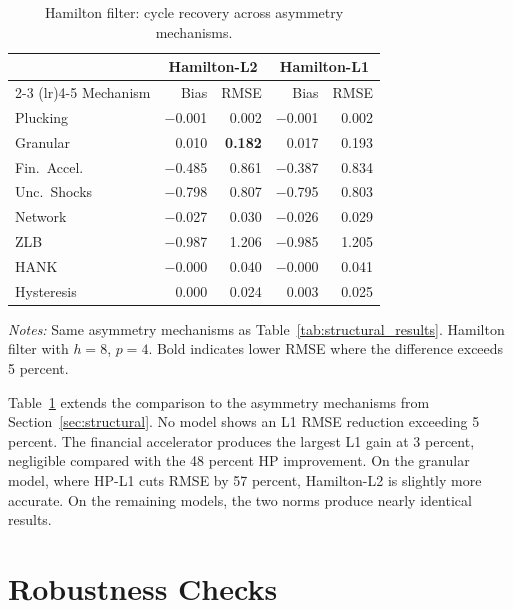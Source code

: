 \documentclass[10pt]{article}
\begin{document}
\begin{table}[htbp]
\centering
\caption{Hamilton filter: cycle recovery across asymmetry mechanisms.}
\label{tab:structural_hamilton}
\begin{tabular}{l rr rr}
\toprule
& \multicolumn{2}{c}{Hamilton-L2} & \multicolumn{2}{c}{Hamilton-L1} \\
\cmidrule(lr){2-3} \cmidrule(lr){4-5}
Mechanism & Bias & RMSE & Bias & RMSE \\
\midrule
Plucking       & $-$0.001 & 0.002 & $-$0.001 & 0.002 \\
Granular       &    0.010 & \textbf{0.182} &    0.017 & 0.193 \\
Fin.\ Accel.   & $-$0.485 & 0.861 & $-$0.387 & 0.834 \\
Unc.\ Shocks   & $-$0.798 & 0.807 & $-$0.795 & 0.803 \\
Network        & $-$0.027 & 0.030 & $-$0.026 & 0.029 \\
ZLB            & $-$0.987 & 1.206 & $-$0.985 & 1.205 \\
HANK           & $-$0.000 & 0.040 & $-$0.000 & 0.041 \\
Hysteresis     &    0.000 & 0.024 &    0.003 & 0.025 \\
\bottomrule
\end{tabular}
\begin{tablenotes}
\small
\item \textit{Notes:} Same asymmetry mechanisms as Table~\ref{tab:structural_results}. Hamilton filter with $h = 8$, $p = 4$. Bold indicates lower RMSE where the difference exceeds 5 percent.
\end{tablenotes}
\end{table}

Table~\ref{tab:structural_hamilton} extends the comparison to the asymmetry mechanisms from Section~\ref{sec:structural}. No model shows an L1 RMSE reduction exceeding 5 percent. The financial accelerator produces the largest L1 gain at 3 percent, negligible compared with the 48 percent HP improvement. On the granular model, where HP-L1 cuts RMSE by 57 percent, Hamilton-L2 is slightly more accurate. On the remaining models, the two norms produce nearly identical results.


\section{Robustness Checks}
\label{app:robustness}
\end{document}
